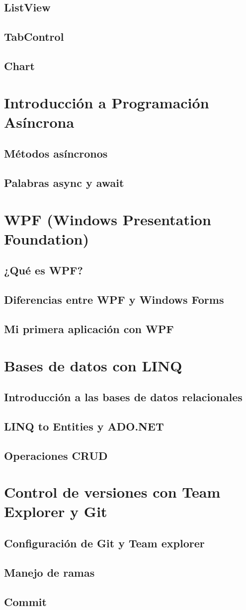 \documentclass[12pt,a4paper]{report}
\begin{document}
\section{ListView}
\section{TabControl}
\section{Chart}

\chapter{Introducción a Programación Asíncrona}
\section{Métodos asíncronos}
\section{Palabras async y await}

\chapter{WPF (Windows Presentation Foundation)}
\section{¿Qué es WPF?}
\section{Diferencias entre WPF y Windows Forms}
\section{Mi primera aplicación con WPF}

\chapter{Bases de datos con LINQ}
\section{Introducción a las bases de datos relacionales}
\section{LINQ to Entities y ADO.NET}
\section{Operaciones CRUD}

\chapter{Control de versiones con Team Explorer y Git}
\section{Configuración de Git y Team explorer}
\section{Manejo de ramas}
\section{Commit}
\end{document}
